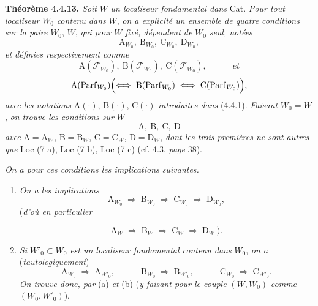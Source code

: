 \textbf{Théorème 4.4.13.} \textit{Soit} $W$ \textit{un localiseur fondamental dans} Cat. \textit{Pour tout localiseur} $W_0$ \textit{contenu dans} $W$, \textit{on a explicité un ensemble de quatre conditions sur la paire} $W_0$, $W$, \textit{qui pour} $W$ \textit{fixé, dépendent de} $W_0$ \textit{seul, notées}
\[
\mathrm{A}_{W_0},\ \mathrm{B}_{W_0},\ \mathrm{C}_{W_0},\ \mathrm{D}_{W_0},
\tag*{(4.4.13.1)}
\]
\textit{et définies respectivement comme}
\[
\mathrm{A}(\mathcal{F}_{W_0}),\ \mathrm{B}(\mathcal{F}_{W_0}),\ \mathrm{C}(\mathcal{F}_{W_0}), \qquad\quad \textit{et}
\]
\[
\mathrm{A}(\mathrm{Parf}_{W_0}) \Bigl(\Longleftrightarrow\; \mathrm{B}(\mathrm{Parf}_{W_0}) \;\Longleftrightarrow\; \mathrm{C}(\mathrm{Parf}_{W_0})\Bigr),
\]
\textit{avec les notations} $\mathrm{A}(\cdot)$, $\mathrm{B}(\cdot)$, $\mathrm{C}(\cdot)$ \textit{introduites dans} (4.4.1). \textit{Faisant} $W_0 = W$, \textit{on trouve les conditions sur} $W$
\[
\mathrm{A},\ \mathrm{B},\ \mathrm{C},\ \mathrm{D}
\tag*{(4.4.13.2)}
\]
\textit{avec} $\mathrm{A} = \mathrm{A}_W$, $\mathrm{B} = \mathrm{B}_W$, $\mathrm{C} = \mathrm{C}_W$, $\mathrm{D} = \mathrm{D}_W$, \textit{dont les trois premières ne sont autres que} Loc (7 a), Loc (7 b), Loc (7 c) (cf. 4.3, \textit{page} 38).

 \textit{On a pour ces conditions les implications suivantes.}

\begin{enumerate}[leftmargin=2.5em]
\item[a)] \textit{On a les implications}
\[
\mathrm{A}_{W_0} \;\Longrightarrow\; \mathrm{B}_{W_0} \;\Longrightarrow\; \mathrm{C}_{W_0} \;\Longrightarrow\; \mathrm{D}_{W_0},
\tag*{(4.4.13.3)}
\]
(\textit{d'où en particulier}

\[
\mathrm{A}_W \;\Longrightarrow\; \mathrm{B}_W \;\Longrightarrow\; \mathrm{C}_W \;\Longrightarrow\; \mathrm{D}_W\ ).
\tag*{(4.4.13.4)}
\]
\item[b)] \textit{Si} $W'_0 \subset W_0$ \textit{est un localiseur fondamental contenu dans} $W_0$, \textit{on a} (\textit{tautologiquement})
\[
\mathrm{A}_{W_0} \;\Longrightarrow\; \mathrm{A}_{W'_0}, \qquad\quad \mathrm{B}_{W_0} \;\Longrightarrow\; \mathrm{B}_{W'_0}, \qquad\quad \mathrm{C}_{W_0} \;\Longrightarrow\; \mathrm{C}_{W'_0}.
\]
\textit{On trouve donc, par} (a) \textit{et} (b) (\textit{y faisant pour le couple} $(W, W_0)$ \textit{comme} $(W_0, W'_0)$),
\end{enumerate}

